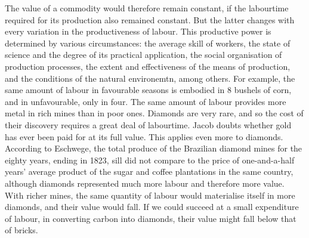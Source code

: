 The value of a commodity would therefore remain constant,
if the labourtime required for its production also remained constant.
But the latter changes with every variation in the productiveness of labour. 
This productive power is determined 
by various circumstances:
the average skill of workers, 
the state of science and the degree of its practical application,
the social organisation of production processes,
the extent and effectiveness of the means of production,
and the conditions of the natural environemtn, among others.
For example,
the same amount of labour in favourable seasons 
is embodied in 8 bushels of corn,
and in unfavourable, only in four.
The same amount of labour provides more metal in rich mines than in poor ones.
Diamonds are very rare, and so the cost of their discovery 
requires a great deal of labourtime.
Jacob doubts whether gold has ever been paid for at its full value.
This applies even more to diamonds. 
According to Eschwege, the total produce
of the Brazilian diamond mines for the eighty years,
ending in 1823,
sill did not compare to the price of 
one-and-a-half years' average product 
of the sugar and coffee plantations in the same country,
although diamonds represented much more labour
and therefore more value.
With richer mines, 
the same quantity of labour would materialise itself in more diamonds,
and their value would fall. 
If we could succeed at a small expenditure of labour,
in converting carbon into diamonds,
their value might fall below that of bricks.